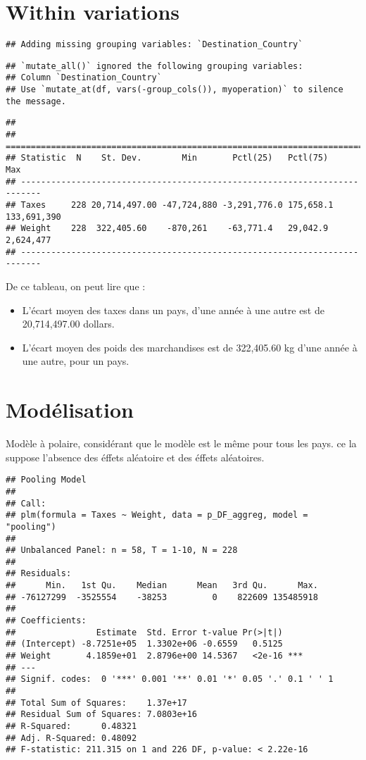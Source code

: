 \documentclass[
]{book}
\providecommand{\tightlist}{%
  \setlength{\itemsep}{0pt}\setlength{\parskip}{0pt}}
\begin{document}
\hypertarget{within-variations}{%
\section{Within variations}\label{within-variations}}

\begin{verbatim}
## Adding missing grouping variables: `Destination_Country`
\end{verbatim}

\begin{verbatim}
## `mutate_all()` ignored the following grouping variables:
## Column `Destination_Country`
## Use `mutate_at(df, vars(-group_cols()), myoperation)` to silence the message.
\end{verbatim}

\begin{verbatim}
## 
## ==========================================================================
## Statistic  N    St. Dev.        Min       Pctl(25)   Pctl(75)      Max    
## --------------------------------------------------------------------------
## Taxes     228 20,714,497.00 -47,724,880 -3,291,776.0 175,658.1 133,691,390
## Weight    228  322,405.60    -870,261    -63,771.4   29,042.9   2,624,477 
## --------------------------------------------------------------------------
\end{verbatim}

De ce tableau, on peut lire que :

\begin{itemize}
\tightlist
\item
  L'écart moyen des taxes dans un pays, d'une année à une autre est de 20,714,497.00 dollars.
\item
  L'écart moyen des poids des marchandises est de 322,405.60 kg d'une année à une autre, pour un pays.
\end{itemize}

\hypertarget{moduxe9lisation}{%
\section{Modélisation}\label{moduxe9lisation}}

Modèle à polaire, considérant que le modèle est le même pour tous les pays. ce la suppose l'absence des éffets aléatoire et des éffets aléatoires.

\begin{verbatim}
## Pooling Model
## 
## Call:
## plm(formula = Taxes ~ Weight, data = p_DF_aggreg, model = "pooling")
## 
## Unbalanced Panel: n = 58, T = 1-10, N = 228
## 
## Residuals:
##      Min.   1st Qu.    Median      Mean   3rd Qu.      Max. 
## -76127299  -3525554    -38253         0    822609 135485918 
## 
## Coefficients:
##                Estimate  Std. Error t-value Pr(>|t|)    
## (Intercept) -8.7251e+05  1.3302e+06 -0.6559   0.5125    
## Weight       4.1859e+01  2.8796e+00 14.5367   <2e-16 ***
## ---
## Signif. codes:  0 '***' 0.001 '**' 0.01 '*' 0.05 '.' 0.1 ' ' 1
## 
## Total Sum of Squares:    1.37e+17
## Residual Sum of Squares: 7.0803e+16
## R-Squared:      0.48321
## Adj. R-Squared: 0.48092
## F-statistic: 211.315 on 1 and 226 DF, p-value: < 2.22e-16
\end{verbatim}
\end{document}
